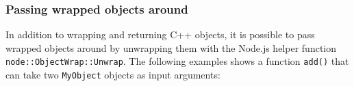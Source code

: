 \subsubsection{Passing wrapped objects
around}\label{passing-wrapped-objects-around}

In addition to wrapping and returning C++ objects, it is possible to
pass wrapped objects around by unwrapping them with the Node.js helper
function \texttt{node::ObjectWrap::Unwrap}. The following examples shows
a function \texttt{add()} that can take two \texttt{MyObject} objects as
input arguments:

\begin{Shaded}
\begin{Highlighting}[]

\OperatorTok{\{}

\OperatorTok{::}\OperatorTok{;}
\OperatorTok{::}\OperatorTok{;}
\OperatorTok{::}\OperatorTok{;}
\OperatorTok{::}\OperatorTok{;}
\OperatorTok{::}\OperatorTok{;}
\OperatorTok{::}\OperatorTok{;}
\OperatorTok{::}\OperatorTok{;}
\OperatorTok{::}\OperatorTok{;}

\OperatorTok{(}\OperatorTok{\textless{}}\OperatorTok{\textgreater{}\&}\OperatorTok{)} \OperatorTok{\{}
\OperatorTok{::}\OperatorTok{(}\OperatorTok{);}
\OperatorTok{\}}

\OperatorTok{(}\OperatorTok{\textless{}}\OperatorTok{\textgreater{}\&}\OperatorTok{)} \OperatorTok{\{}
\OperatorTok{*}\OperatorTok{=}\OperatorTok{();}
\OperatorTok{\textless{}}\OperatorTok{\textgreater{}}\OperatorTok{=}\OperatorTok{{-}\textgreater{}}\OperatorTok{();}


\end{Highlighting}
\end{Shaded}
